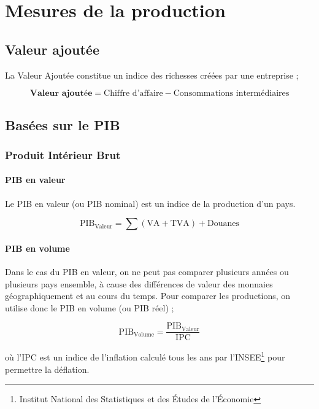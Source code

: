 \documentclass[10pt,a4paper,french]{article}
\begin{document}
\section{Mesures de la production}

\subsection{Valeur ajoutée}

La Valeur Ajoutée constitue un indice des richesses créées par une entreprise ;

\[
\textbf{Valeur ajoutée} = \text{Chiffre d'affaire} - \text{Consommations intermédiaires}
\]

\subsection{Basées sur le PIB}

\subsubsection{Produit Intérieur Brut}

\paragraph{PIB en valeur}

Le PIB en valeur (ou PIB nominal) est un indice de la production d’un pays.

\[
\text{PIB}_\text{Valeur} = \sum (\text{VA}+\text{TVA})+\text{Douanes}
\]

\paragraph{PIB en volume}

Dans le cas du PIB en valeur, on ne peut pas comparer plusieurs années ou plusieurs pays ensemble, à
cause des différences de valeur des monnaies géographiquement et au cours du temps. Pour comparer les
productions, on utilise donc le PIB en volume (ou PIB réel) ;

\[
\text{PIB}_\text{Volume} = \frac{\text{PIB}_\text{Valeur}}{\text{IPC}}
\]

où l’IPC est un indice de l’inflation calculé tous les ans par l’INSEE\footnote{Institut National des Statistiques et des Études de l'Économie} pour permettre la déflation.
\end{document}
